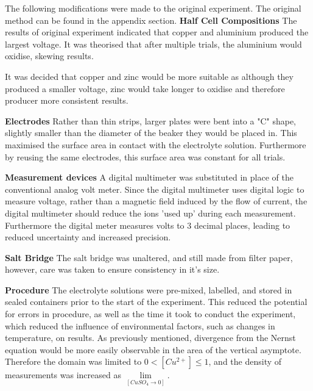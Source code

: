 \documentclass[10.5pt,a4paper]{article}
\begin{document}
The following modifications were made to the original experiment. The original method can be found in the appendix section.\newline
\textbf{Half Cell Compositions}\newline
The results of original experiment indicated that copper and aluminium produced the largest voltage. It was theorised that after multiple trials, the aluminium would oxidise, skewing results.

It was decided that copper and zinc would be more suitable as although they produced a smaller voltage, zinc would take longer to oxidise and therefore producer more consistent results.

\textbf{Electrodes}\newline
Rather than thin strips, larger plates were bent into a "C" shape, slightly smaller than the diameter of the beaker they would be placed in. This maximised the surface area in contact with the electrolyte solution. Furthermore by reusing the same electrodes, this surface area was constant for all trials.

\textbf{Measurement devices}\newline
A digital multimeter was substituted in place of the conventional analog volt meter. Since the digital multimeter uses digital logic to measure voltage, rather than a magnetic field induced by the flow of current, the digital multimeter should reduce the ions 'used up' during each measurement. Furthermore the digital meter measures volts to 3 decimal places, leading to reduced uncertainty and increased precision. 

\textbf{Salt Bridge}\newline
The salt bridge was unaltered, and still made from filter paper, however, care was taken to ensure consistency in it's size.

\textbf{Procedure}\newline
The electrolyte solutions were pre-mixed, labelled, and stored in sealed containers prior to the start of the experiment. This reduced the potential for errors in procedure, as well as the time it took to conduct the experiment, which reduced the influence of environmental factors, such as changes in temperature, on results.
As previously mentioned, divergence from the Nernst equation would be more easily observable in the area of the vertical asymptote. Therefore the domain was limited to $0<[Cu^{2+}]\leq1$, and the density of measurements was increased as $\lim\limits_{[CuSO_4\rightarrow 0]}$.
\end{document}
